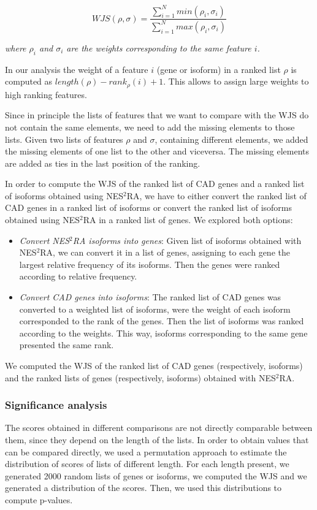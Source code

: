 \documentclass[fleqn,10pt]{SelfArx} %
\begin{document}
$$
WJS(\rho, \sigma) = \dfrac{\sum_{i=1}^Nmin(\rho_i,\sigma_i)}{\sum_{i=1}^Nmax(\rho_i,\sigma_i)}
$$

\noindent
\textit{where $\rho_i$ and $\sigma_i$ are the weights corresponding to the same feature $i$.}\medskip

In our analysis the weight of a feature $i$ (gene or isoform) in a ranked list $\rho$ is computed as $length(\rho) - rank_{\rho}(i) + 1$. This allows to assign large weights to high ranking features.

Since in principle the lists of features that we want to compare with the WJS do not contain the same elements, we need to add the missing elements to those lists. Given two lists of features $\rho$ and $\sigma$, containing different elements, we added the missing elements of one list to the other and viceversa. The missing elements are added as ties in the last position of the ranking.

In order to compute the WJS of the ranked list of CAD genes and a ranked list of isoforms obtained using NES$^2$RA, we have to either convert the ranked list of CAD genes in a ranked list of isoforms or convert the ranked list of isoforms obtained using NES$^2$RA in a ranked list of genes. We explored both options:

\begin{itemize}
	\item \textit{Convert NES$^2$RA isoforms into genes}: Given list of isoforms obtained with NES$^2$RA, we can convert it in a list of genes, assigning to each gene the largest relative frequency of its isoforms. Then the genes were ranked according to relative frequency.
	\item \textit{Convert CAD genes into isoforms}: The ranked list of CAD genes was converted to a weighted list of isoforms, were the weight of each isoform corresponded to the rank of the genes. Then the list of isoforms was ranked according to the weights. This way, isoforms corresponding to the same gene presented the same rank.
\end{itemize}

We computed the WJS of the ranked list of CAD genes (respectively, isoforms) and the ranked lists of genes (respectively, isoforms) obtained with NES$^2$RA.

\subsubsection{Significance analysis} 

The scores obtained in different comparisons are not directly comparable between them, since they depend on the length of the lists. In order to obtain values that can be compared directly, we used a permutation approach to estimate the distribution of scores of lists of different length. For each length present, we generated 2000 random lists of genes or isoforms, we computed the WJS and we generated a distribution of the scores. Then, we used this distributions to compute p-values.
\end{document}
